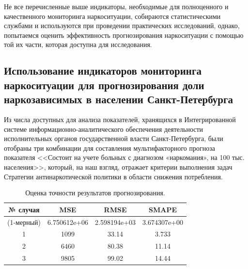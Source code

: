\documentclass[a4paper,14pt]{article}
\begin{document}
Не все перечисленные выше индикаторы, необходимые для полноценного и 
качественного мониторинга наркоситуации, собираются статистическими службами 
и используются при проведении практических исследований, однако, попытаемся 
оценить эффективность прогнозирования наркоситуации с помощью той их части, 
которая доступна для исследования.

\subsection{Использование индикаторов мониторинга наркоситуации для 
    прогнозирования доли наркозависимых в населении Санкт-Петербурга}

Из числа доступных для анализа показателей, хранящихся в Интегрированной системе 
информационно-аналитического обеспечения деятельности исполнительных органов 
государственной власти Санкт-Петербурга, были отобраны три комбинации для 
составления мультифакторного прогноза показателя <<Состоит на учете больных с 
диагнозом «наркомания», на 100 тыс. населения>>, который, на наш взгляд, 
отражает критерии выполнения задач Стратегии антинаркотической политики в 
области снижения потребления.

\begin{table}[bhtp]
    \caption{Оценка точности результатов прогнозирования.}
    \begin{center}
        \begin{tabular}{ | c | c | c | c | }
            \hline
            № случая & MSE & RMSE & SMAPE \\
            \hline
            (1-мерный) & 6.750612e+06 & 2.598194e+03 & 3.674307e+00  \\
            \hline
            1 & 1099 & 33.14 & 3.733  \\
            \hline
            2 & 6460 & 80.38 & 11.14  \\
            \hline
            3 & 9805 & 99.02 & 14.44  \\
            \hline
        \end{tabular}		
    \end{center}
    \label{table:WM-error-multi}	
\end{table}
\end{document}
